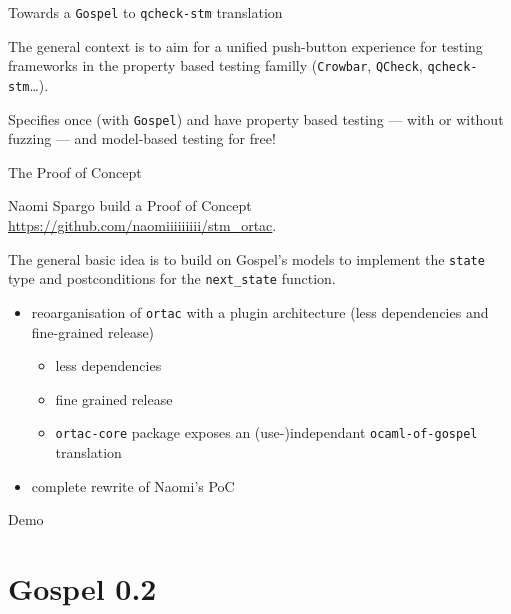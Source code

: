 \documentclass[pdf]{beamer}
\begin{document}
\begin{frame}{Towards a \texttt{Gospel} to \texttt{qcheck-stm} translation}

  The general context is to aim for a unified push-button experience for
  testing frameworks in the property based testing familly (\texttt{Crowbar},
  \texttt{QCheck}, \texttt{qcheck-stm}\dots).

  Specifies once (with \texttt{Gospel}) and have property based testing ---
  with or without fuzzing --- and model-based testing for free!

\end{frame}

\begin{frame}{The Proof of Concept}

  Naomi Spargo build a Proof of Concept \url{https://github.com/naomiiiiiiiii/stm_ortac}.

  The general basic idea is to build on Gospel's models to implement the
  \texttt{state} type and postconditions for the \texttt{next\_state} function.

\end{frame}

\begin{frame}{}

  \begin{itemize}
    \item reoarganisation of \texttt{ortac} with a plugin architecture (less
      dependencies and fine-grained release)
      \begin{itemize}
        \item less dependencies
        \item fine grained release
        \item \texttt{ortac-core} package exposes an (use-)independant
          \texttt{ocaml-of-gospel} translation
      \end{itemize}
    \item complete rewrite of Naomi's PoC
  \end{itemize}

\end{frame}

\begin{frame}
  \centering
  \huge{Demo}
\end{frame}

\section{Gospel 0.2}
\end{document}
